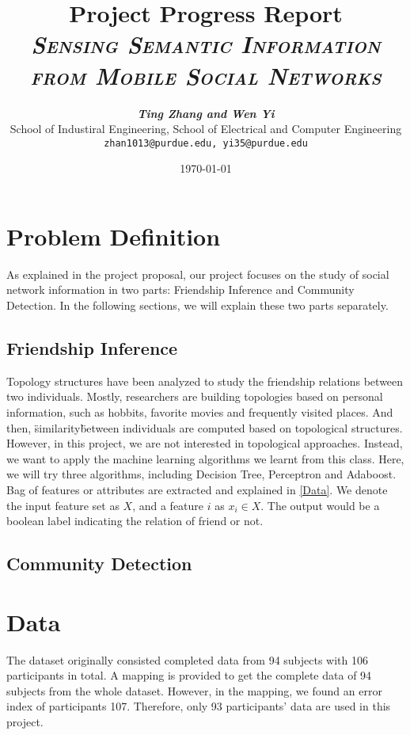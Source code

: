 \documentclass[11pt]{article}
\title{
\textbf{Project Progress Report} \\ \textsc{\textit{Sensing Semantic Information from Mobile Social Networks}} \\
}
\author{
	\textbf{\textit{Ting Zhang and Wen Yi}} \\
	School of Industiral Engineering, School of Electrical and Computer Engineering\\
	\texttt{zhan1013@purdue.edu, yi35@purdue.edu}
}
\date{\today}
\begin{document}
\maketitle


\section{Problem Definition}
As explained in the project proposal, our project focuses on the study of social network information in two parts:  Friendship Inference and Community Detection. In the following sections, we will explain these two parts separately.
\subsection{Friendship Inference}
Topology structures have been analyzed to study the friendship relations between two individuals. Mostly, researchers are building topologies based on personal information, such as hobbits, favorite movies and frequently visited places. And then, \"similarity\" between individuals are computed based on topological structures. However, in this project, we are not interested in topological approaches. Instead, we want to apply the machine learning algorithms we learnt from this class. Here, we will try three algorithms, including Decision Tree, Perceptron and Adaboost. Bag of features or attributes are extracted and explained in \ref{Data}. We denote the input feature set as \(X\), and a feature \(i\) as \(x_i \in X\). The output would be a boolean label indicating the relation of friend or not.

\subsection{Community Detection}

\section{Data}
The dataset originally consisted completed data from 94 subjects with 106 participants in total. A mapping is provided to get the complete data of 94 subjects from the whole dataset. However, in the mapping, we found an error index of participants 107. Therefore, only 93 participants' data are used in this project. 
\end{document}
